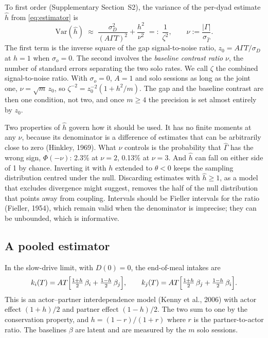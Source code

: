 \documentclass[12pt]{article}
\newcommand{\ki}{k_i}
\newcommand{\kj}{k_j}
\begin{document}
To first order (Supplementary Section~S2), the variance of the per-dyad estimate
$\hat h$ from \eqref{eq:estimator} is
\begin{equation}\label{eq:zeta}
\mathrm{Var}(\hat h)\;\approx\;\frac{\sigma_D^2}{(A\Gamma T)^2}+\frac{h^2}{\nu^2}
\;=:\;\frac{1}{\zeta^2},
\qquad
\nu:=\frac{|\Gamma|}{\sigma_{\hat\Gamma}} .
\end{equation}
The first term is the inverse square of the gap signal-to-noise ratio,
$z_0=A\Gamma T/\sigma_D$ at $h=1$ when $\sigma_o=0$. The second involves the \emph{baseline contrast ratio} $\nu$, the number
of standard errors separating the two solo rates. We call $\zeta$ the combined
signal-to-noise ratio. With $\sigma_o=0$, $A=1$ and solo sessions as long as the
joint one, $\nu=\sqrt m\,z_0$, so $\zeta^{-2}=z_0^{-2}(1+h^2/m)$. The gap and the
baseline contrast are then one condition, not two, and once $m\geq4$ the
precision is set almost entirely by $z_0$.

Two properties of $\hat h$ govern how it should be used. It has no finite moments
at any $\nu$, because its denominator is a difference of estimates that can be
arbitrarily close to zero (Hinkley, 1969). What $\nu$ controls is the probability
that $\hat\Gamma$ has the wrong sign, $\Phi(-\nu)$: 2.3\% at $\nu=2$, 0.13\% at
$\nu=3$. And $\hat h$ can fall on either side of 1 by chance. Inverting it with $h$
extended to $\theta<0$ keeps the sampling distribution centred under the null.
Discarding estimates with $\hat h\geq1$, as a model that excludes divergence
might suggest, removes the half of the null distribution that points away from
coupling. Intervals should be Fieller intervals for the ratio (Fieller, 1954),
which remain valid when the denominator is imprecise; they can be unbounded,
which is informative.

\subsection*{A pooled estimator}

In the slow-drive limit, with $D(0)=0$, the end-of-meal intakes are
\begin{equation}\label{eq:apim}
\ki(T)=AT\Bigl[\tfrac{1+h}{2}\,\beta_i+\tfrac{1-h}{2}\,\beta_j\Bigr],
\qquad
\kj(T)=AT\Bigl[\tfrac{1+h}{2}\,\beta_j+\tfrac{1-h}{2}\,\beta_i\Bigr].
\end{equation}
This is an actor--partner interdependence model (Kenny et al., 2006) with actor
effect $(1+h)/2$ and partner effect $(1-h)/2$. The two sum to one by the
conservation property, and $h=(1-r)/(1+r)$ where $r$ is the partner-to-actor
ratio. The baselines $\beta$ are latent and are measured by the $m$ solo sessions.
\end{document}
